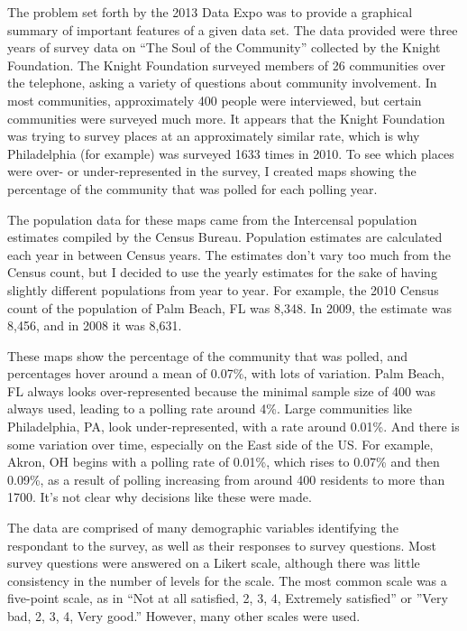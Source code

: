 \documentclass{article}\usepackage{graphicx, color}
\begin{document}
The problem set forth by the 2013 Data Expo was to provide a graphical summary of important features of a given data set. The data provided were three years of survey data on ``The Soul of the Community'' collected by the Knight Foundation. The Knight Foundation surveyed members of 26 communities over the telephone, asking a variety of questions about community involvement. In most communities, approximately 400 people were interviewed, but certain communities were surveyed much more. It appears that the Knight Foundation was trying to survey places at an approximately similar rate, which is why Philadelphia (for example) was surveyed 1633 times in 2010. To see which places were over- or under-represented in the survey, I created maps showing the percentage of the community that was polled for each polling year.

The population data for these maps came from the Intercensal population estimates compiled by the Census Bureau. Population estimates are calculated each year in between Census years. The estimates don't vary too much from the Census count, but I decided to use the yearly estimates for the sake of having slightly different populations from year to year. For example, the 2010 Census count of the population of Palm Beach, FL was 8,348. In 2009, the estimate was 8,456, and in 2008 it was 8,631. 

These maps show the percentage of the community that was polled, and percentages hover around a mean of 0.07\%, with lots of variation. Palm Beach, FL always looks over-represented because the minimal sample size of 400 was always used, leading to a polling rate around 4\%. Large communities like Philadelphia, PA, look under-represented, with a rate around 0.01\%. And there is some variation over time, especially on the East side of the US. For example, Akron, OH begins with a polling rate of 0.01\%, which rises to 0.07\% and then 0.09\%, as a result of polling increasing from around 400 residents to more than 1700. It's not clear why decisions like these were made. 

The data are comprised of many demographic variables identifying the respondant to the survey, as well as their responses to survey questions. Most survey questions were answered on a Likert scale, although there was little consistency in the number of levels for the scale. The most common scale was a five-point scale, as in ``Not at all satisfied, 2, 3, 4, Extremely satisfied'' or ''Very bad, 2, 3, 4, Very good.'' However, many other scales were used. 
\end{document}
